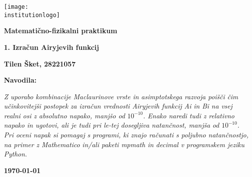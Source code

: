 \newcommand{\institutionname}{Univerza v Ljubljani}
\newcommand{\projecttitle}{1. Izračun Airyjevih funkcij}
\newcommand{\authorname}{Tilen Šket, 28221057}
\newcommand{\instructions}{\textit{Z uporabo kombinacije Maclaurinove vrste in asimptotskega razvoja poišči čim učinkovitejši
        postopek za izračun vrednosti Airyjevih funkcij Ai in Bi na vsej realni osi z absolutno napako, manjšo
        od $10^{-10}$. Enako naredi tudi z relativno napako in ugotovi, ali je tudi pri le-tej dosegljiva natančnost,
        manjša od $10^{-10}$. Pri oceni napak si pomagaj s programi, ki znajo računati s poljubno natančnostjo,
        na primer z Mathematico in/ali paketi mpmath in decimal v programskem jeziku Python.}}
\newcommand{\subjectname}{Matematično-fizikalni praktikum}
\newcommand{\institutionlogo}{UlFmf_logo.pdf}

\begin{titlepage}
    \centering

    \texttt{[image: \\institutionlogo]}

    \vspace{1.0cm}

    \Large
    \textbf{\subjectname}

    \vspace{1.0cm}

    \LARGE
    \textbf{\projecttitle}

    \vspace{1.0cm}

    \Large
    \textbf{\authorname}

    \vfill

    \large
    \textbf{Navodila:}

    \vspace{0.5cm}

    \large
    \instructions%

    \vspace{0.5cm}
    \vfill

    \large
    \textbf{\today}

\end{titlepage}